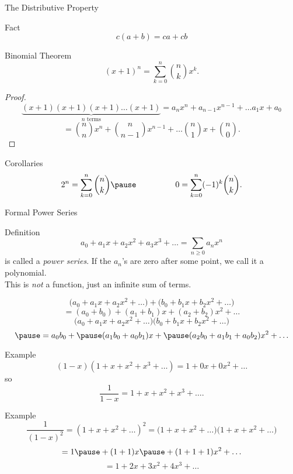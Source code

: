 \documentclass[xcolor=dvipsnames]{beamer}
\begin{document}
\begin{frame}{The Distributive Property}
  \pause
  \begin{block}{Fact} 
    $$c(a + b) = ca + cb$$
  \end{block}
\end{frame}


\begin{frame}
  \begin{block}{Binomial Theorem}
    $$(x + 1)^n = \sum_{k = 0}^n \binom{n}{k} x^k .$$
  \end{block}
  \pause

  \vspace{-2pc}

  \begin{proof}
    \small
    $$ \underbrace{(x+1)(x+1)(x+1) \ldots (x+1)}_\text{$n$ terms} =
      a_n x^n + a_{n-1}x^{n-1} + \ldots a_1 x + a_0 $$
      $$= \binom{n}{n}x^n + \binom{n}{n-1}x^{n-1} + \ldots \binom{n}{1}x + 
       \binom{n}{0} .  $$
  \end{proof}
  \pause

  \vspace{-1pc}

  \begin{block}{Corollaries}
    $$ 2^n = \sum_{k=0}^n \binom{n}{k} \pause \hspace{4pc} 0 = 
      \sum_{k=0}^n (-1)^k \binom{n}{k}.$$
  \end{block}
\end{frame}


\begin{frame}{Formal Power Series}
  \pause
  \begin{block}{Definition}
    $$ a_0 + a_1 x + a_2 x^2 + a_3 x^3 + \ldots = \sum_{n \geq 0} a_n x^n$$
    is called a \emph{power series}. If the $a_n$'s are zero after some point, we
    call it a polynomial.\\ \pause 
    This is \emph{not} a function, just an infinite sum of terms.
  \end{block}
  \pause
  $$ \Big(a_0 + a_1x + a_2 x^2 + \ldots\Big) +
    \Big(b_0 + b_1x + b_2 x^2 + \ldots \Big)$$
  $$ = (a_0 + b_0) + (a_1 + b_1)x + (a_2 + b_2)x^2 + \ldots $$
  \pause
  $$ \Big(a_0 +a_1x + a_2x^2 + \ldots \Big) 
    \Big(b_0 + b_1x +b_2x^2 +\ldots \Big)$$
  $$ \pause = a_0 b_0 + \pause(a_1b_0 + a_0b_1) x + 
    \pause (a_2b_0 + a_1b_1 + a_0b_2)x^2 + \ldots$$
\end{frame}


\begin{frame}
  \begin{block}{Example}
    $$ (1-x)(1 + x + x^2 + x^3 + \ldots ) = 1 + 0x + 0x^2 + \ldots$$
    \pause
    so 
    $$ \frac{1}{1-x} = 1 + x + x^2 + x^3 + \ldots .$$
  \end{block}
  \pause
  \begin{block}{Example}
    $$\frac{1}{(1-x)^2} = (1 + x + x^2 + \ldots )^2 = 
      \Big(1 + x + x^2 + \ldots \Big) \Big(1 + x + x^2 + \ldots \Big)$$
    \pause
    $$ = 1 \pause + (1 + 1)x \pause + (1+1+1)x^2 + \ldots $$
    \pause
    $$ = 1 + 2x + 3x^2 + 4x^3 + \ldots $$
  \end{block}
\end{frame}
\end{document}
